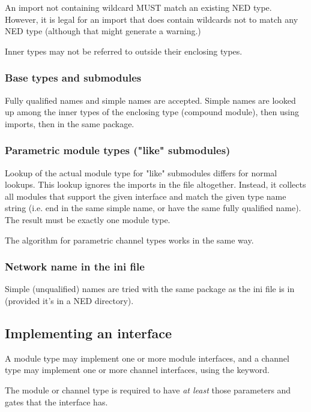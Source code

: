 An import not containing wildcard MUST match an existing NED type.
However, it is legal for an import that does contain wildcards
not to match any NED type (although that might generate a warning.)

Inner types may not be referred to outside their enclosing types.

\subsubsection{Base types and submodules}

Fully qualified names and simple names are accepted. Simple names
are looked up among the inner types of the enclosing type (compound
module), then using imports, then in the same package.


\subsubsection{Parametric module types ("like" submodules)}

Lookup of the actual module type for "like" submodules differs for normal
lookups. This lookup ignores the imports in the file altogether.
Instead, it collects all modules that support the given interface
and match the given type name string (i.e. end in the same simple name,
or have the same fully qualified name). The result must be exactly
one module type.

The algorithm for parametric channel types works in the same way.


\subsubsection{Network name in the ini file}

Simple (unqualified) names are tried with the same package as the
ini file is in (provided it's in a NED directory).


\subsection{Implementing an interface}
\label{ch-ned-ref:sec:implementing-an-interface}

A module type may implement one or more module interfaces, and a channel type
may implement one or more channel interfaces, using the 
keyword.

The module or channel type is required to have \textit{at least} those
parameters and gates that the interface has.


